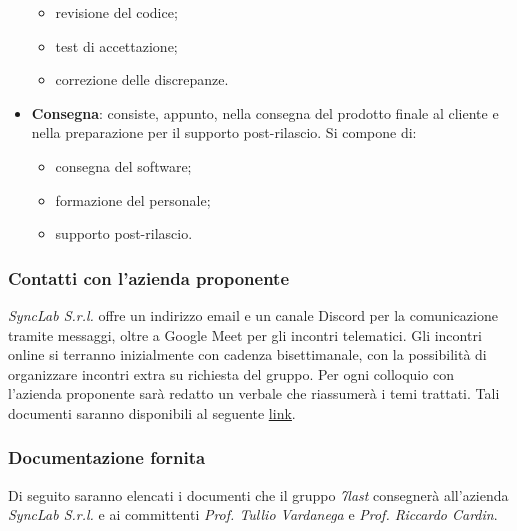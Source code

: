 \begin{itemize}
	      \begin{itemize}
		      \item revisione del codice;
		      \item test di accettazione;
		      \item correzione delle discrepanze.
	      \end{itemize}
	\item \textbf{Consegna}: consiste, appunto, nella consegna del prodotto finale al cliente e nella preparazione per il supporto post-rilascio. Si compone di:
	      \begin{itemize}
		      \item consegna del software;
		      \item formazione del personale;
		      \item supporto post-rilascio.
	      \end{itemize}
\end{itemize}

\subsubsection{Contatti con l'azienda proponente}
\textit{SyncLab S.r.l.} offre un indirizzo email e un canale Discord per la comunicazione tramite messaggi, oltre a Google Meet per gli incontri telematici. Gli incontri online si terranno inizialmente con cadenza bisettimanale, con la possibilità di organizzare incontri extra su richiesta del gruppo. Per ogni colloquio con l’azienda proponente sarà redatto un verbale che riassumerà i temi trattati. Tali documenti saranno disponibili al seguente \href{https://7last.github.io/docs/category/verbali-esterni}{\underline{link}}.

\subsubsection{Documentazione fornita}
Di seguito saranno elencati i documenti che il gruppo \textit{7last} consegnerà all'azienda \textit{SyncLab S.r.l.} e ai committenti \textit{Prof. Tullio Vardanega} e \textit{Prof. Riccardo Cardin}.
\newpage

